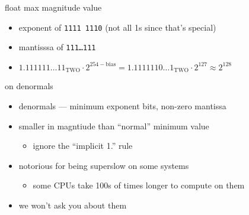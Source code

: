 \begin{frame}{float max magnitude value}
\begin{itemize}
\item exponent of {\tt 1111 1110}  (not all 1s since that's special) 
\item mantisssa of {\tt 111\ldots111}
\item $1.111111\ldots11_\text{TWO} \cdot 2^{254-\text{bias}} = 1.1111110\ldots1_\text{TWO} \cdot 2^{127} \approx 2^{128}$
\end{itemize}
\end{frame}

\begin{frame}{on denormals}
\begin{itemize}
\item denormals --- minimum exponent bits, non-zero mantissa
\item smaller in magntiude than ``normal'' minimum value
    \begin{itemize}
    \item ignore the ``implicit 1.'' rule
    \end{itemize}
\item notorious for being superslow on some systems
    \begin{itemize}
    \item some CPUs take 100s of times longer to compute on them
    \end{itemize}
\item we won't ask you about them
\end{itemize}
\end{frame}


